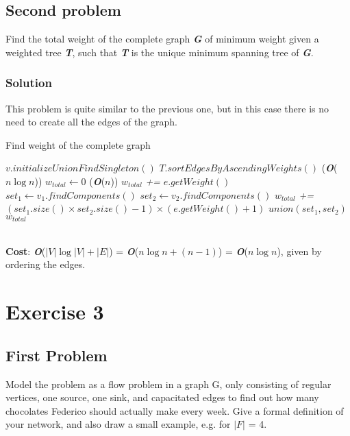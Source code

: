 \documentclass[11pt]{article}
\begin{document}
\subsection*{Second problem}
Find the total weight of the complete graph \textbf{\textit{G}} of minimum weight given a weighted tree \textbf{\textit{T}}, such that  \textbf{\textit{T}} is the unique minimum spanning tree of \textbf{\textit{G}}.
\subsubsection*{Solution}
This problem is quite similar to the previous one, but in this case there is no need to create all the edges of the graph.
\begin{algorithm}
	\caption{Find weight of the complete graph}\label{euclid}
	\begin{algorithmic}[1]
			\State $v.initializeUnionFindSingleton()$
		\EndFor
		\State $T.sortEdgesByAscendingWeights()$ \qquad \qquad \qquad \qquad \qquad \qquad \qquad (\textbf{\textit{O}}($n\log{n}$))
		\State $w_{total} \gets 0$
		 \qquad \qquad \qquad \qquad \qquad \qquad \qquad \qquad \qquad \qquad (\textbf{\textit{O}}($n$))
			\State $w_{total}$ \textit{+=} $e.getWeight()$
			\State  $set_1 \gets v_1.findComponents()$
			\State  $set_2 \gets v_2.findComponents()$
			\State $w_{total}$ \textit{+=} $(set_1.size() \times set_2.size() - 1) \times (e.getWeight() + 1)$
			\State $union(set_1, set_2)$
		\EndFor
		\State \Return $w_{total}$
	\end{algorithmic}
\end{algorithm} \\
\textbf{Cost}: \textbf{\textit{O}}($|V|\log{|V|} + |E|$) = \textbf{\textit{O}}($n\log{n} + (n-1)$) = \textbf{\textit{O}}($n\log{n}$), given by ordering the edges.
\newpage

\section*{Exercise 3}
\subsection*{First Problem}
Model the problem as a flow problem in a graph G, only consisting of regular vertices, one
source, one sink, and capacitated edges to find out how many chocolates Federico should
actually make every week. Give a formal definition of your network, and also draw a small
example, e.g. for $|F|$ = 4.
\end{document}
